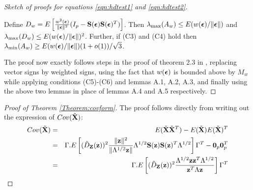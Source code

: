 \documentclass[fleqn,11pt]{article}
\begin{document}
\begin{proof}[Sketch of proofs for equations \ref{eqn:hdtest1} and \ref{eqn:hdtest2}]
\begin{Lemma}
Define $D_w = E \left[ \frac{w^2({\boldsymbol{\epsilon}})}{\| {\boldsymbol{\epsilon}} \|^2} (I_p - {\mathbf{S}}({\boldsymbol{\epsilon}}) {\mathbf{S}}({\boldsymbol{\epsilon}})^T )\right] $. Then $\lambda_{\max} (A_w) \leq E( w({\boldsymbol{\epsilon}})/\| {\boldsymbol{\epsilon}} \|)$ and $\lambda_{\max} (D_w) \leq E( w({\boldsymbol{\epsilon}})/\| {\boldsymbol{\epsilon}} \|)^2$. Further, if (C3) and (C4) hold then $\lambda_{\min} (A_w) \geq E( w({\boldsymbol{\epsilon}})/\| {\boldsymbol{\epsilon}} \|)(1+o(1))/\sqrt 3$.
\end{Lemma}
%
The proof now exactly follows steps in the proof of theorem 2.3 in \cite{WangPengLi15}, replacing vector signs by weighted signs, using the fact that $w({\boldsymbol{\epsilon}})$ is bounded above by $M_w$ while applying conditions (C5)-(C6) and lemmas A.1, A.2, A.3, and finally using the above two lemmas in place of lemmas A.4 and A.5 respectively.
\end{proof}

\begin{proof}[Proof of Theorem  \ref{Theorem:covform}]
The proof follows directly from writing out the expression of $Cov ( \tilde {{\mathbf{X}}})$:
%
\begin{eqnarray*}
Cov(\tilde{{\mathbf{X}}}) &=& E(\tilde{{\mathbf{X}}} \tilde{{\mathbf{X}}}^T) - E(\tilde{{\mathbf{X}}}) E(\tilde{{\mathbf{X}}})^T\\
&=& \Gamma . E \left[ (\tilde D_{\mathbf{Z}}({\bf{z}}))^2 \frac{\|{\bf{z}}\|^2}{\| \Lambda^{1/2}{\bf{z}}\|} \Lambda^{1/2} {\mathbf{S}}({\bf{z}}) {\mathbf{S}}({\bf{z}})^T \Lambda^{1/2} \right] \Gamma^T - {\bf 0}_p {\bf 0}_p^T\\
&=& \Gamma .E \left[ (\tilde D_{\mathbf{Z}}({\bf{z}}))^2 \frac{\Lambda^{1/2} {\bf{z}} {\bf{z}}^T \Lambda^{1/2}}{{\bf{z}}^T \Lambda {\bf{z}}} \right] \Gamma^T
\end{eqnarray*}
%
\end{proof}
\end{document}
